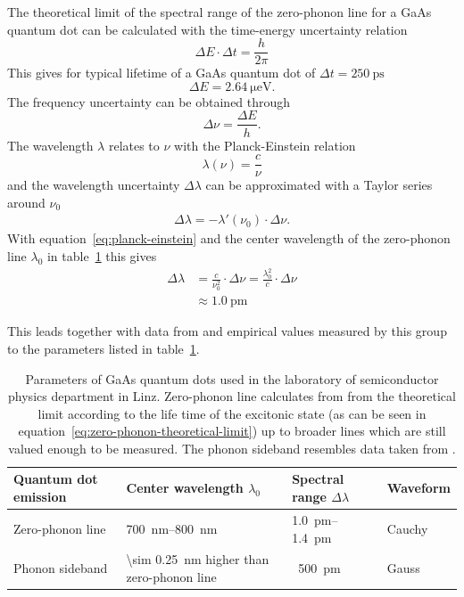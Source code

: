 The theoretical limit of the spectral range of the zero-phonon line for a GaAs quantum dot can be calculated with the time-energy uncertainty relation
\begin{equation}
\Delta E \cdot \Delta t = \frac{h}{2 \pi}
\end{equation}
This gives for typical lifetime of a GaAs quantum dot of $\Delta t = \SI{250}{\pico \second}$
\begin{equation}
\Delta E = \SI{2.64}{\micro \electronvolt}.
\end{equation}
The frequency uncertainty can be obtained through
\begin{equation}
\label{eq:planck-einstein}
\Delta \nu = \frac{\Delta E}{h}.
\end{equation}
The wavelength $\lambda$ relates to $\nu$ with the Planck-Einstein relation 
\begin{equation}
\lambda(\nu) = \frac{c}{\nu}
\end{equation}
and the wavelength uncertainty $\Delta \lambda$ can be approximated with a Taylor series around $\nu_0$
\begin{align}
\Delta \lambda = - \lambda'(\nu_0)\cdot \Delta \nu.
\end{align}
With equation~\eqref{eq:planck-einstein} and the center wavelength of the zero-phonon line $\lambda_{0}$ in table~\ref{tab:quantum-dot-emission} this gives
\begin{align}
\Delta \lambda &= \frac{c}{\nu_0^2} \cdot \Delta \nu = \frac{\lambda_0^2}{c}\cdot\Delta \nu\\
\label{eq:zero-phonon-theoretical-limit}
&\approx \SI{1.0}{\pico \metre}
\end{align}

This leads together with data from \textcite{scholl_resonance_2019} and empirical values measured by this group to the parameters listed in table~\ref{tab:quantum-dot-emission}.

\begin{table}[H]
	\caption[Paramters of GaAs quantum dots used in the laboratory of semiconductor physics department in Linz.]{Parameters of GaAs quantum dots used in the laboratory of semiconductor physics department in Linz.
		Zero-phonon line calculates from from the theoretical limit according to the life time of the excitonic state (as can be seen in equation~\eqref{eq:zero-phonon-theoretical-limit}) up to broader lines which are still valued enough to be measured.
		The phonon sideband resembles data taken from \textcite{scholl_resonance_2019}.}
	\label{tab:quantum-dot-emission}
	\begin{tabular}{@{}llll@{}}
		\toprule
		Quantum dot emission & Center wavelength $\lambda_0$           & Spectral range $\Delta \lambda$ & Waveform                  \\ \midrule
		Zero-phonon line               & \SIrange{700}{800}{\nano \metre} & \SIrange{1.0}{1.4}{\pico \metre} & Cauchy\\
		Phonon sideband       & \SI{\sim 0.25}{\nano \metre} higher than zero-phonon line  & ~\SI{500}{\pico \metre} & Gauss  \\ \bottomrule
	\end{tabular}
\end{table}



